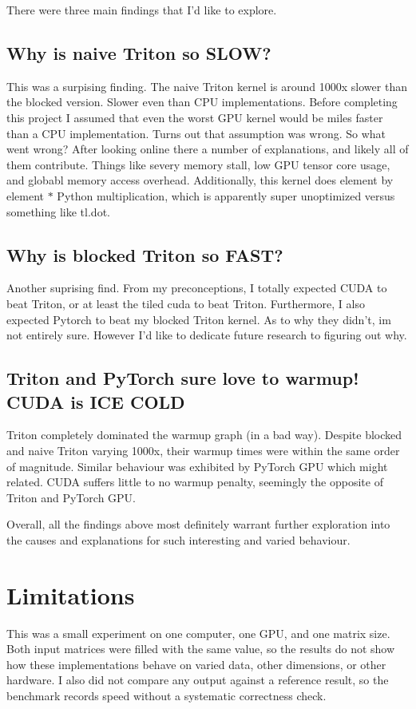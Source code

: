 \documentclass[11pt,letterpaper]{article}
\begin{document}
There were three main findings that I'd like to explore.

\subsection{Why is naive Triton so SLOW?}
This was a surpising finding. The naive Triton kernel is around 1000x slower than the blocked version. Slower even than CPU implementations. Before completing this project I assumed that even the worst GPU kernel would be miles faster than a CPU implementation. Turns out that assumption was wrong. So what went wrong? After looking online there a number of explanations, and likely all of them contribute. Things like severy memory stall, low GPU tensor core usage, and globabl memory access overhead. Additionally, this kernel does element by element $*$ Python multiplication, which is apparently super unoptimized versus something like tl.dot.

\subsection{Why is blocked Triton so FAST?}
Another suprising find. From my preconceptions, I totally expected CUDA to beat Triton, or at least the tiled cuda to beat Triton. Furthermore, I also expected Pytorch to beat my blocked Triton kernel. As to why they didn't, im not entirely sure. However I'd like to dedicate future research to figuring out why.

\subsection{Triton and PyTorch sure love to warmup! CUDA is ICE COLD}
Triton completely dominated the warmup graph (in a bad way). Despite blocked and naive Triton varying 1000x, their warmup times were within the same order of magnitude. Similar behaviour was exhibited by PyTorch GPU which might related. CUDA suffers little to no warmup penalty, seemingly the opposite of Triton and PyTorch GPU.

Overall, all the findings above most definitely warrant further exploration into the causes and explanations for such interesting and varied behaviour.


\section{Limitations}
This was a small experiment on one computer, one GPU, and one matrix size. Both input matrices were filled with the same value, so the results do not show how these implementations behave on varied data, other dimensions, or other hardware. I also did not compare any output against a reference result, so the benchmark records speed without a systematic correctness check.
\end{document}
